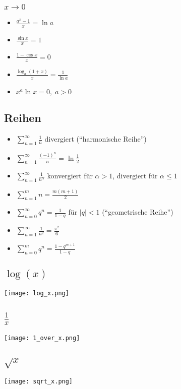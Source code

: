 \begin{multicols}{2}
\subsubsection{$x \to 0$}
\begin{multicols}{2}
\begin{itemize}[leftmargin=*]
  \item $\frac{a^x - 1}{x} = \ln a$
  \item $\frac{\sin x}{x} = 1$
  \item $\frac{1 - \cos x}{x} = 0$
  \item $\frac{\log_a (1 + x)}{x} = \frac{1}{\ln a}$
  \item $x^a \ln x = 0, \; a  > 0$
\end{itemize}
\end{multicols}

\subsection{Reihen}
\begin{itemize}[leftmargin=*]
	\item $\sum_{n=1}^\infty \frac{1}{n}$ divergiert (``harmonische Reihe'')
	\item $\sum_{n=1}^\infty \frac{(-1)^n}{n} = \ln \frac{1}{2}$
	\item $\sum_{n=1}^\infty \frac{1}{n^\alpha}$ konvergiert für $\alpha > 1$,
	divergiert für $\alpha \leq 1$
	\item $\sum_{n=1}^m n = \frac{m(m+1)}{2}$
	\item $\sum_{n=0}^\infty q^n = \frac{1}{1-q}$ für $|q| < 1$ (``geometrische
	Reihe'')
	\item $\sum_{n=1}^\infty \frac{1}{n^2} = \frac{\pi^2}{6}$
	\item $\sum_{n=0}^m q^n = \frac{1-q^{m+1}}{1-q}$ 
\end{itemize}

\subsection{\texorpdfstring{$\log(x)$}{log(x)}}
\texttt{[image: log\_x.png]}

\subsection{\texorpdfstring{$\frac{1}{x}$}{1/x}}
\texttt{[image: 1\_over\_x.png]}

\subsection{\texorpdfstring{$\sqrt{x}$}{x^(1/x)}}
\texttt{[image: sqrt\_x.png]}


\end{multicols}
